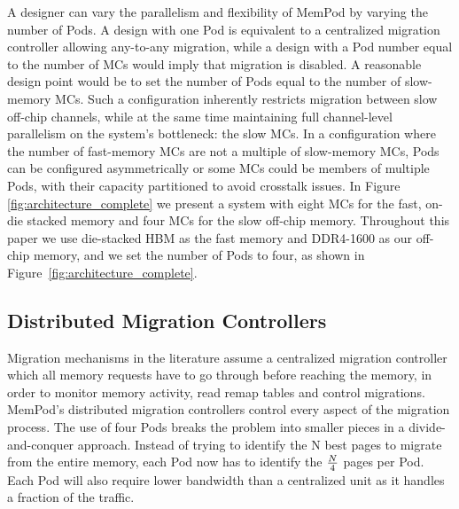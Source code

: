 A designer can vary the parallelism and flexibility of MemPod by varying the
number of Pods. A design with one Pod is equivalent to a centralized 
migration controller allowing any-to-any migration,
while a design with a Pod number equal to the number of MCs would imply that migration is disabled. A reasonable design point would be to set the number of Pods equal to the number of slow-memory MCs. Such a configuration inherently restricts migration between slow off-chip channels, while at the same time maintaining full channel-level parallelism on the system's bottleneck: the slow MCs. In a configuration where the number of fast-memory MCs are not a multiple of slow-memory MCs, Pods can be configured asymmetrically or some MCs could be members of multiple Pods, with their capacity partitioned to avoid crosstalk issues. In Figure \ref{fig:architecture_complete} we present a system with eight MCs for the fast, on-die stacked memory and four MCs for the slow off-chip memory. Throughout this paper we use die-stacked HBM as the fast memory \cite{JEDEC-HBM-REVISED} and DDR4-1600 as our off-chip memory, and
we set the number of Pods to four, as shown in Figure~\ref{fig:architecture_complete}.

\subsection{Distributed Migration Controllers}


Migration mechanisms in the literature \cite{sim-micro2014,cameo} assume a centralized migration controller which all memory requests have to go through before reaching the memory, in order to monitor memory activity, read remap tables and control migrations. MemPod's distributed migration controllers control every aspect of the migration process. The use of four Pods breaks the problem into smaller pieces in a divide-and-conquer approach. Instead of trying to identify the N best pages to migrate from the entire memory, each Pod now has to identify the $N\over4$ pages per Pod. 
Each Pod will also require lower bandwidth than a centralized unit as it handles a fraction of the traffic.

